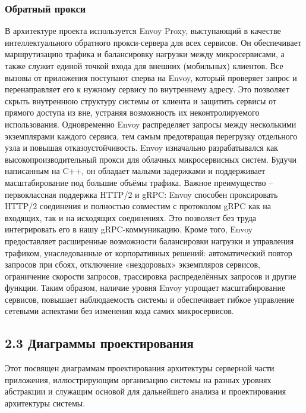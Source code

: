 \subsubsection*{Обратный прокси}
В архитектуре проекта используется Envoy Proxy, выступающий в качестве интеллектуального обратного прокси-сервера для всех сервисов. Он обеспечивает маршрутизацию трафика и балансировку нагрузки между микросервисами, а также служит единой точкой входа для внешних (мобильных) клиентов. Все вызовы от приложения поступают сперва на Envoy, который проверяет запрос и перенаправляет его к нужному сервису по внутреннему адресу. Это позволяет скрыть внутреннюю структуру системы от клиента и защитить сервисы от прямого доступа из вне, устраняя возможность их неконтролируемого использования. Одновременно Envoy распределяет запросы между несколькими экземплярами каждого сервиса, тем самым предотвращая перегрузку отдельного узла и повышая отказоустойчивость.
Envoy изначально разрабатывался как высокопроизводительный прокси для облачных микросервисных систем. Будучи написанным на C++, он обладает малыми задержками и поддерживает масштабирование под большие объёмы трафика. Важное преимущество – первоклассная поддержка HTTP/2 и gRPC: Envoy способен проксировать HTTP/2 соединения и полностью совместим с протоколом gRPC как на входящих, так и на исходящих соединениях. Это позволяeт без труда интегрировать его в нашу gRPC-коммуникацию. Кроме того, Envoy предоставляет расширенные возможности балансировки нагрузки и управления трафиком, унаследованные от корпоративных решений: автоматический повтор запросов при сбоях, отключение «нездоровых» экземпляров сервисов, ограничение скорости запросов, трассировка распределённых запросов и другие функции. Таким образом, наличие уровня Envoy упрощает масштабирование сервисов, повышает наблюдаемость системы и обеспечивает гибкое управление сетевыми аспектами без изменения кода самих микросервисов.

\subsection*{2.3 Диаграммы проектирования}
Этот посвящен диаграммам проектирования архитектуры серверной части приложения, иллюстрирующим организацию системы на разных уровнях абстракции и служащим основой для дальнейшего анализа и проектирования архитектуры системы.

